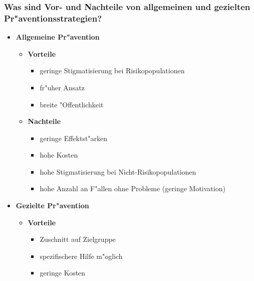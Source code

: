 \subsubsection{Was sind Vor- und Nachteile von allgemeinen und gezielten Pr"aventionsstrategien?}
\begin{itemize}
        \item \textbf{Allgemeine Pr"avention}
                \begin{itemize}
                        \item \textbf{Vorteile}
                                \begin{itemize}
                                        \item geringe Stigmatisierung bei Risikopopulationen
                                        \item fr"uher Ansatz
                                        \item breite "Offentlichkeit
                                \end{itemize}
                        \item \textbf{Nachteile}
                                \begin{itemize}
                                        \item geringe Effektst"arken
                                        \item hohe Kosten
                                        \item hohe Stigmatisierung bei Nicht-Risikopopulationen
                                        \item hohe Anzahl an F"allen ohne Probleme (geringe Motivation)
                                \end{itemize}
                \end{itemize}
        \item \textbf{Gezielte Pr"avention}
                \begin{itemize}
                        \item \textbf{Vorteile}
                                \begin{itemize}
                                        \item Zuschnitt auf Zielgruppe
                                        \item spezifischere Hilfe m"oglich
                                        \item geringe Kosten
                                \end{itemize}

\end{itemize}
\end{itemize}
